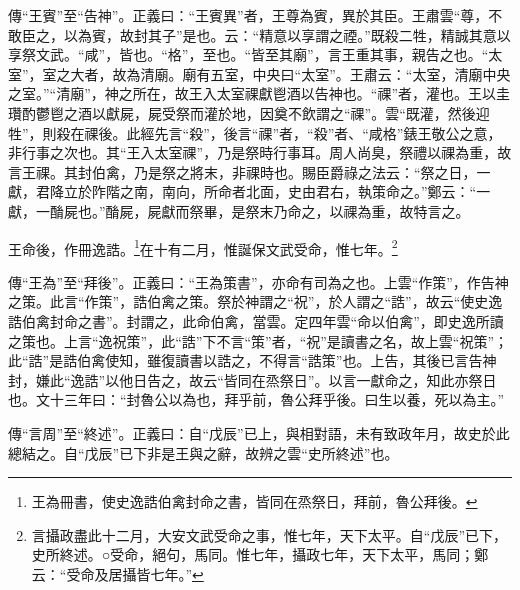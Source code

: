 {\noindent\zhuan{}\fzbyks 傳“王賓”至“告神”。正義曰：“王賓異”者，王尊為賓，異於其臣。王肅雲“尊，不敢臣之，以為賓，故封其子”是也。云：“精意以享謂之禋。”既殺二牲，精誠其意以享祭文武。“咸”，皆也。“格”，至也。“皆至其廟”，言王重其事，親告之也。“太室”，室之大者，故為清廟。廟有五室，中央曰“太室”。王肅云：“太室，清廟中央之室。”“清廟”，神之所在，故王入太室祼獻鬯酒以告神也。“祼”者，灌也。王以圭瓚酌鬱鬯之酒以獻屍，屍受祭而灌於地，因奠不飲謂之“祼”。雲“既灌，然後迎牲”，則殺在祼後。此經先言“殺”，後言“祼”者，“殺”者、“咸格”錶王敬公之意，非行事之次也。其“王入太室祼”，乃是祭時行事耳。周人尚臭，祭禮以祼為重，故言王祼。其封伯禽，乃是祭之將末，非祼時也。賜臣爵祿之法云：“祭之日，一獻，君降立於阼階之南，南向，所命者北面，史由君右，執策命之。”鄭云：“一獻，一酳屍也。”酳屍，屍獻而祭畢，是祭末乃命之，以祼為重，故特言之。 \par}

王命後，作冊逸誥。\footnote{王為冊書，使史逸誥伯禽封命之書，皆同在烝祭日，拜前，魯公拜後。}在十有二月，惟誕保文武受命，惟七年。\footnote{言攝政盡此十二月，大安文武受命之事，惟七年，天下太平。自“戊辰”已下，史所終述。○受命，絕句，馬同。惟七年，攝政七年，天下太平，馬同；鄭云：“受命及居攝皆七年。”}

{\noindent\zhuan{}\fzbyks 傳“王為”至“拜後”。正義曰：“王為策書”，亦命有司為之也。上雲“作策”，作告神之策。此言“作策”，誥伯禽之策。祭於神謂之“祝”，於人謂之“誥”，故云“使史逸誥伯禽封命之書”。封謂之，此命伯禽，當雲。定四年雲“命以伯禽”，即史逸所讀之策也。上言“逸祝策”，此“誥”下不言“策”者，“祝”是讀書之名，故上雲“祝策”；此“誥”是誥伯禽使知，雖復讀書以誥之，不得言“誥策”也。上告，其後已言告神封，嫌此“逸誥”以他日告之，故云“皆同在烝祭日”。以言一獻命之，知此亦祭日也。文十三年曰：“封魯公以為也，拜乎前，魯公拜乎後。曰生以養，死以為主。” \par}

{\noindent\zhuan{}\fzbyks 傳“言周”至“終述”。正義曰：自“戊辰”已上，與相對語，未有致政年月，故史於此總結之。自“戊辰”已下非是王與之辭，故辨之雲“史所終述”也。 \par}

